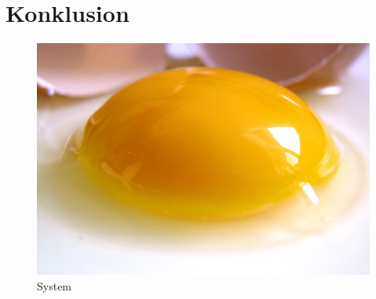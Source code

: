 \section{Konklusion}
\begin{figure}[H]
    \centering
    \includegraphics[width=0.70\linewidth]{Projectdoc/Assets/Illustrationer/Egg}
    \caption{System}
    \label{fig:sysdiagram}
\end{figure}